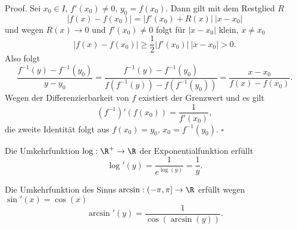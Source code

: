 \documentclass[letterpaper,10pt,english]{jupyterBook}
\begin{document}
\begin{emphBox}{}{}
Proof. Sei \(x_0 \in I\), \(f'(x_0) \neq 0\), \(y_0 =f(x_0)\). Dann gilt mit dem Restglied \(R\)
\begin{equation*}
 \vert f(x) - f(x_0) \vert = \vert f'(x_0) + R(x) \vert ~\vert x- x_0\vert
\end{equation*}
und wegen \(R(x) \rightarrow 0\) und \(f'(x_0) \neq 0\) folgt für \(|x-x_0|\) klein, \(x \neq x_0\)
\begin{equation*}
 |f(x) - f(x_0)| \geq \frac{1}2 |f'(x_0)| ~|x-x_0| > 0.
\end{equation*}
Also folgt
\begin{equation*}
\frac{f^{-1}(y) - f^{-1}(y_0)}{y-y_0} =  \frac{f^{-1}(y) - f^{-1}(y_0)}{f(f^{-1}(y)) - f(f^{-1}(y_0))} =\frac{x -x_0}{f(x) - f(x_0)}.
\end{equation*}
Wegen der Differenzierbarkeit von \(f\) existiert der Grenzwert und es gilt
\begin{equation*}
 (f^{-1})'(f(x_0)) = \frac{1}{f'(x_0)},
\end{equation*}
die zweite Identität folgt aus \(f(x_0)=y_0\), \(x_0 = f^{-1}(y_0)\). \(\square\)
\end{emphBox}
\label{differential/kombfkt:example-6}
\begin{example}{}{}



Die Umkehrfunktion \(\log: \R^+ \rightarrow \R\) der Exponentialfunktion erfüllt
\begin{equation*}
 \log'(y)  = \frac{1}{e^{\log(y)}} = \frac{1}y.
\end{equation*}\end{example}
\label{differential/kombfkt:example-7}
\begin{example}{}{}



Die Umkehrfunktion des Sinus \(\arcsin: (-\pi,\pi] \rightarrow \R\)   erfüllt wegen \(\sin'(x) = \cos(x)\)
\begin{equation*}
 \arcsin'(y)  = \frac{1}{ \cos(\arcsin(y))} .
\end{equation*}\end{example}
\end{document}
